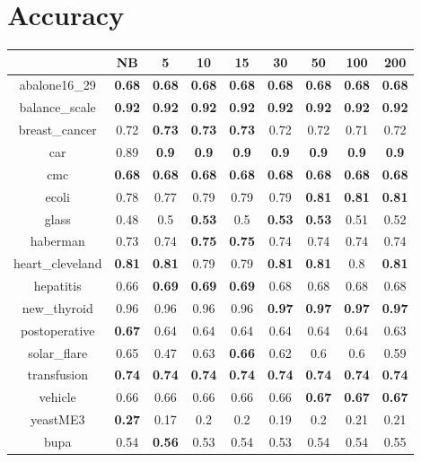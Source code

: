 \documentclass{article}%
\begin{document}
%
\normalsize%
\section*{Accuracy}%
\begin{tabular}{c|cccccccc}%
\hline%
&NB&5&10&15&30&50&100&200\\%
\hline%
abalone16\_29&\textbf{0.68}&\textbf{0.68}&\textbf{0.68}&\textbf{0.68}&\textbf{0.68}&\textbf{0.68}&\textbf{0.68}&\textbf{0.68}\\%
\hline%
balance\_scale&\textbf{0.92}&\textbf{0.92}&\textbf{0.92}&\textbf{0.92}&\textbf{0.92}&\textbf{0.92}&\textbf{0.92}&\textbf{0.92}\\%
\hline%
breast\_cancer&0.72&\textbf{0.73}&\textbf{0.73}&\textbf{0.73}&0.72&0.72&0.71&0.72\\%
\hline%
car&0.89&\textbf{0.9}&\textbf{0.9}&\textbf{0.9}&\textbf{0.9}&\textbf{0.9}&\textbf{0.9}&\textbf{0.9}\\%
\hline%
cmc&\textbf{0.68}&\textbf{0.68}&\textbf{0.68}&\textbf{0.68}&\textbf{0.68}&\textbf{0.68}&\textbf{0.68}&\textbf{0.68}\\%
\hline%
ecoli&0.78&0.77&0.79&0.79&0.79&\textbf{0.81}&\textbf{0.81}&\textbf{0.81}\\%
\hline%
glass&0.48&0.5&\textbf{0.53}&0.5&\textbf{0.53}&\textbf{0.53}&0.51&0.52\\%
\hline%
haberman&0.73&0.74&\textbf{0.75}&\textbf{0.75}&0.74&0.74&0.74&0.74\\%
\hline%
heart\_cleveland&\textbf{0.81}&\textbf{0.81}&0.79&0.79&\textbf{0.81}&\textbf{0.81}&0.8&\textbf{0.81}\\%
\hline%
hepatitis&0.66&\textbf{0.69}&\textbf{0.69}&\textbf{0.69}&0.68&0.68&0.68&0.68\\%
\hline%
new\_thyroid&0.96&0.96&0.96&0.96&\textbf{0.97}&\textbf{0.97}&\textbf{0.97}&\textbf{0.97}\\%
\hline%
postoperative&\textbf{0.67}&0.64&0.64&0.64&0.64&0.64&0.64&0.63\\%
\hline%
solar\_flare&0.65&0.47&0.63&\textbf{0.66}&0.62&0.6&0.6&0.59\\%
\hline%
transfusion&\textbf{0.74}&\textbf{0.74}&\textbf{0.74}&\textbf{0.74}&\textbf{0.74}&\textbf{0.74}&\textbf{0.74}&\textbf{0.74}\\%
\hline%
vehicle&0.66&0.66&0.66&0.66&0.66&\textbf{0.67}&\textbf{0.67}&\textbf{0.67}\\%
\hline%
yeastME3&\textbf{0.27}&0.17&0.2&0.2&0.19&0.2&0.21&0.21\\%
\hline%
bupa&0.54&\textbf{0.56}&0.53&0.54&0.53&0.54&0.54&0.55\\%

\end{tabular}
\end{document}
